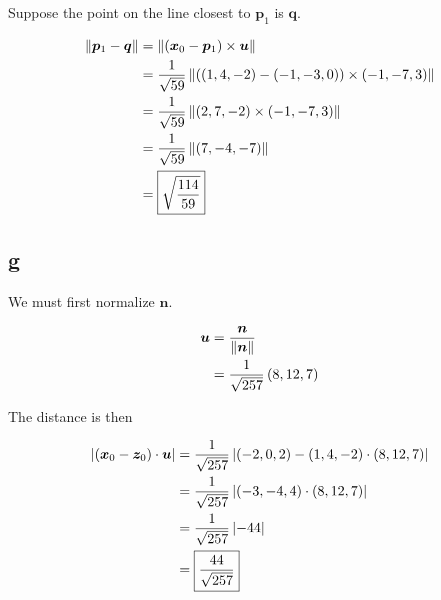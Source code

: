 \documentclass{article}
\begin{document}
Suppose the point on the line closest to $\bm{p}_1$ is $\bm{q}$.

\begin{align*}
  \left\lVert\bm{p}_1 - \bm{q}\right\rVert &= \left\lVert\left ( \bm{x}_0 - \bm{p}_1 \right) \times \bm{u}\right\rVert \\
                           &= \frac{1}{\sqrt{59}} \left\lVert\left ( \left ( 1, 4, -2 \right) - \left ( -1, -3, 0 \right) \right) \times \left ( -1, -7, 3 \right)\right\rVert \\
                           &= \frac{1}{\sqrt{59}} \left\lVert\left ( 2, 7, -2 \right) \times \left ( -1, -7, 3 \right)\right\rVert \\
                           &= \frac{1}{\sqrt{59}} \left\lVert\left ( 7, -4, -7 \right)\right\rVert \\
                           &= \boxed{\sqrt{\frac{114}{59}}} \\
\end{align*}


\subsection*{g}

We must first normalize $\bm{n}$.

\begin{align*}
  \bm{u} &= \frac{\bm{n}}{\left\lVert\bm{n}\right\rVert} \\
  &= \frac{1}{\sqrt{257}} \left ( 8, 12, 7 \right) \\
\end{align*}

The distance is then

\begin{align*}
  \left\lvert \left ( \bm{x}_0 - \bm{z}_0 \right) \cdot \bm{u} \right\rvert &= \frac{1}{\sqrt{257}} \left\lvert \left ( -2, 0, 2 \right) - \left ( 1, 4, -2 \right) \cdot \left ( 8, 12, 7 \right) \right\rvert \\
                                                &= \frac{1}{\sqrt{257}} \left\lvert \left ( -3, -4, 4 \right) \cdot \left ( 8, 12, 7 \right) \right\rvert \\
                                                &= \frac{1}{\sqrt{257}} \left\lvert -44 \right\rvert \\
                                                &= \boxed{\frac{44}{\sqrt{257}}} \\
\end{align*}
\end{document}
